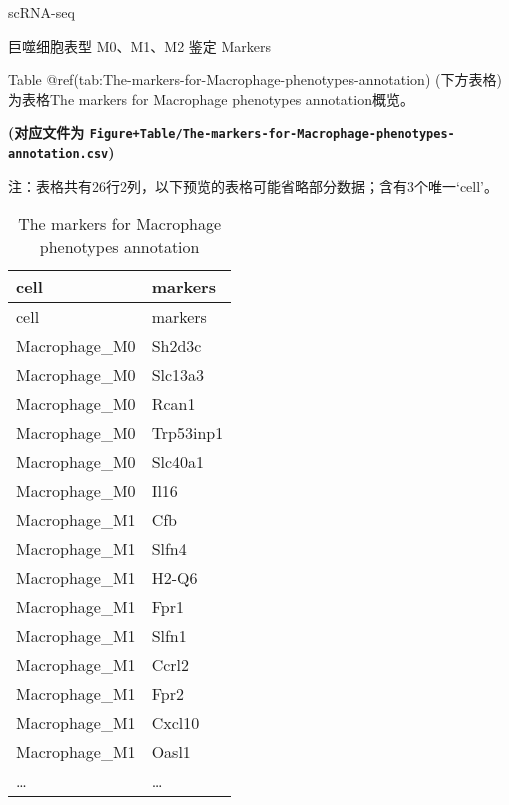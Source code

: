 \documentclass[
  ignorenonframetext,
]{beamer}
\begin{document}
\begin{frame}[fragile]{scRNA-seq}
\begin{block}{巨噬细胞表型 M0、M1、M2 鉴定 Markers}
\protect\hypertarget{ux5de8ux566cux7ec6ux80deux8868ux578b-m0m1m2-ux9274ux5b9a-markers}{}
\begin{center}\vspace{1.5cm}\end{center}

Table @ref(tab:The-markers-for-Macrophage-phenotypes-annotation)
(下方表格) 为表格The markers for Macrophage phenotypes annotation概览。

\textbf{(对应文件为
\texttt{Figure+Table/The-markers-for-Macrophage-phenotypes-annotation.csv})}

\begin{center}\begin{tcolorbox}[colback=gray!10, colframe=gray!50, width=0.9\linewidth, arc=1mm, boxrule=0.5pt]注：表格共有26行2列，以下预览的表格可能省略部分数据；含有3个唯一`cell'。
\end{tcolorbox}
\end{center}

\begin{longtable}[]{@{}ll@{}}
\caption{The markers for Macrophage phenotypes
annotation}\tabularnewline
\toprule
cell & markers\tabularnewline
\midrule
\endfirsthead
\toprule
cell & markers\tabularnewline
\midrule
\endhead
Macrophage\_M0 & Sh2d3c\tabularnewline
Macrophage\_M0 & Slc13a3\tabularnewline
Macrophage\_M0 & Rcan1\tabularnewline
Macrophage\_M0 & Trp53inp1\tabularnewline
Macrophage\_M0 & Slc40a1\tabularnewline
Macrophage\_M0 & Il16\tabularnewline
Macrophage\_M1 & Cfb\tabularnewline
Macrophage\_M1 & Slfn4\tabularnewline
Macrophage\_M1 & H2-Q6\tabularnewline
Macrophage\_M1 & Fpr1\tabularnewline
Macrophage\_M1 & Slfn1\tabularnewline
Macrophage\_M1 & Ccrl2\tabularnewline
Macrophage\_M1 & Fpr2\tabularnewline
Macrophage\_M1 & Cxcl10\tabularnewline
Macrophage\_M1 & Oasl1\tabularnewline
\ldots{} & \ldots{}\tabularnewline
\bottomrule
\end{longtable}

\begin{center}\vspace{1.5cm}\end{center}

\begin{center}\vspace{1.5cm}\end{center}


\end{block}
\end{frame}
\end{document}
